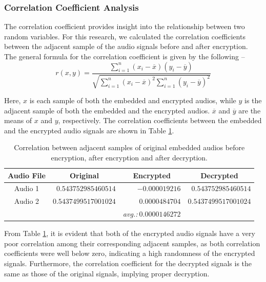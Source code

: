 \documentclass[a4paper]{cas-sc}
\begin{document}
\subsubsection{Correlation Coefficient Analysis}
The correlation coefficient provides insight into the relationship between two random variables. For this research, we calculated the correlation coefficients between the adjacent sample of the audio signals before and after encryption. The general formula for the correlation coefficient is given by the following --
\begin{equation}
    r(x,y)=\frac{\sum_{i=1}^{n}(x_i-\overline{x})(y_i-\overline{y})}{\sqrt{\sum_{i=1}^{n}(x_i-\overline{x})^2\sum_{i=1}^{n}(y_i-\overline{y})^2}}
\end{equation}

Here, $x$ is each sample of both the embedded and encrypted audios, while $y$ is the adjacent sample of both the embedded and the encrypted audios. $\overline{x}$ and $\overline{y}$ are the means of $x$ and $y$, respectively. The correlation coefficients between the embedded and the encrypted audio signals are shown in Table \ref{table:corrcoef}.
\begin{table}[pos=h]
    \begin{center}
        \caption{Correlation between adjacent samples of original embedded audios before encryption, after encryption and after decryption.}
        \begin{tabular}{crrr}
            \hline
            \multicolumn{1}{c|}{Audio File} & \multicolumn{1}{c}{Original} & \multicolumn{1}{c}{Encrypted}          & \multicolumn{1}{c}{Decrypted} \\ \hline
            \multicolumn{1}{c|}{Audio 1}    & $0.543752985460514$          & $-0.000019216$                         & $0.543752985460514$           \\
            \multicolumn{1}{c|}{Audio 2}    & $0.5437499517001024$         & $0.0000484704$                         & $0.5437499517001024$          \\ \hline
                                            &                              & \textit{avg.:}$\mathbf{~0.0000146272}$ &                               \\
        \end{tabular}
        \label{table:corrcoef}
    \end{center}
\end{table}

From Table \ref{table:corrcoef}, it is evident that both of the encrypted audio signals have a very poor correlation among their corresponding adjacent samples, as both correlation coefficients were well below zero, indicating a high randomness of the encrypted signals. Furthermore, the correlation coefficient for the decrypted signals is the same as those of the original signals, implying proper decryption.
\end{document}
